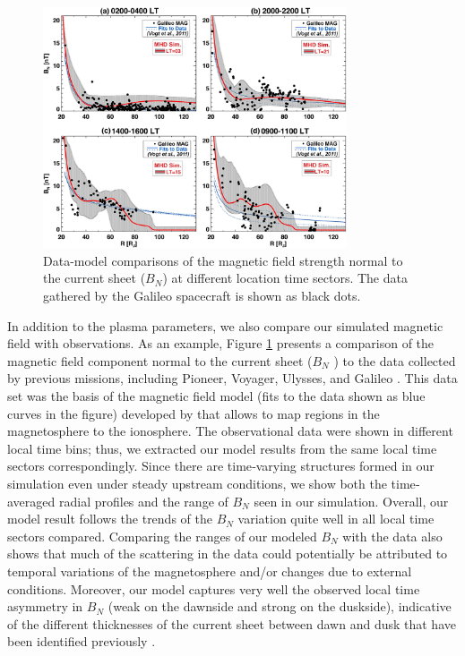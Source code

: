 \begin{figure}
    \centering
    \includegraphics[width=0.8\textwidth]{images2/comparison-magneticfield.jpg}
    \caption{Data-model comparisons of the magnetic field strength normal to the current sheet ($B_N$) at different location time sectors. The data gathered by the Galileo spacecraft is shown as black dots.}
    \label{fig:comparison-magneticfield}
\end{figure}

In addition to the plasma parameters, we also compare our simulated magnetic field with observations. As an example, Figure \ref{fig:comparison-magneticfield} presents a comparison of the magnetic field component normal to the current sheet ($B_N$ ) to the data collected by previous missions, including Pioneer, Voyager, Ulysses, and Galileo \cite{Vogt2011a}. This data set was the basis of the magnetic field model (fits to the data shown as blue curves in the figure) developed by \cite{Vogt2011a} that allows to map regions in the magnetosphere to the ionosphere. The observational data were shown in different local time bins; thus, we extracted our model results from the same local time sectors correspondingly. Since there are time‐varying structures formed in our simulation even under steady upstream conditions, we show both the time‐averaged radial profiles and the range of $B_N$ seen in our simulation. Overall, our model result follows the trends of the $B_N$ variation quite well in all local time sectors compared. Comparing the ranges of our modeled $B_N$ with the data also shows that much of the scattering in the data could potentially be attributed to temporal variations of the magnetosphere and/or changes due to external conditions. Moreover, our model captures very well the observed local time asymmetry in $B_N$ (weak on the dawnside and strong on the duskside), indicative of the different thicknesses of the current sheet between dawn and dusk that have been identified previously \cite{Khurana2005,Kivelson2002a}.

